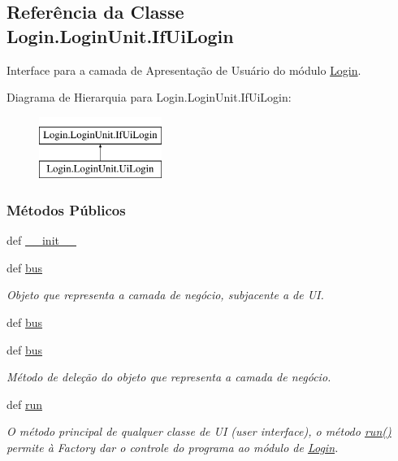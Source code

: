 \hypertarget{classLogin_1_1LoginUnit_1_1IfUiLogin}{\subsection{Referência da Classe Login.\-Login\-Unit.\-If\-Ui\-Login}
\label{classLogin_1_1LoginUnit_1_1IfUiLogin}
}


Interface para a camada de Apresentação de Usuário do módulo \hyperlink{namespaceLogin}{Login}.  


Diagrama de Hierarquia para Login.\-Login\-Unit.\-If\-Ui\-Login\-:\begin{figure}[H]
\begin{center}
\leavevmode
\includegraphics[height=2.000000cm]{d9/d56/classLogin_1_1LoginUnit_1_1IfUiLogin}
\end{center}
\end{figure}
\subsubsection*{Métodos Públicos}
\begin{DoxyCompactItemize}
\item 
def \hyperlink{classLogin_1_1LoginUnit_1_1IfUiLogin_a2afcef7056181566ac0e801ad8094ece}{\-\_\-\-\_\-init\-\_\-\-\_\-}
\item 
def \hyperlink{classLogin_1_1LoginUnit_1_1IfUiLogin_abab63bd2085f485ca82494db8eb5f520}{bus}
\begin{DoxyCompactList}\small\item\em Objeto que representa a camada de negócio, subjacente a de U\-I. \end{DoxyCompactList}\item 
def \hyperlink{classLogin_1_1LoginUnit_1_1IfUiLogin_abab63bd2085f485ca82494db8eb5f520}{bus}
\item 
def \hyperlink{classLogin_1_1LoginUnit_1_1IfUiLogin_abab63bd2085f485ca82494db8eb5f520}{bus}
\begin{DoxyCompactList}\small\item\em Método de deleção do objeto que representa a camada de negócio. \end{DoxyCompactList}\item 
def \hyperlink{classLogin_1_1LoginUnit_1_1IfUiLogin_ac6250c19afa63158907c6e8b4ff6dbd5}{run}
\begin{DoxyCompactList}\small\item\em O método principal de qualquer classe de U\-I (user interface), o método \hyperlink{classLogin_1_1LoginUnit_1_1IfUiLogin_ac6250c19afa63158907c6e8b4ff6dbd5}{run()} permite à Factory dar o controle do programa ao módulo de \hyperlink{namespaceLogin}{Login}. \end{DoxyCompactList}\end{DoxyCompactItemize}
